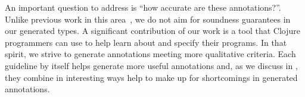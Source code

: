 \begin{figure}
\end{figure}


An important question to address is ``how accurate are these annotations?''.
Unlike previous work in this area~\cite{An10dynamicinference}, we do not aim for soundness guarantees
in our generated types. 
A significant contribution of our work is a tool that Clojure programmers
can use to help learn about and specify their programs.
In that spirit, we strive to generate annotations meeting more qualitative criteria.
Each guideline by itself helps generate more useful annotations and,
as we discuss in ,
they combine in interesting ways help to make up for shortcomings
in generated annotations.

